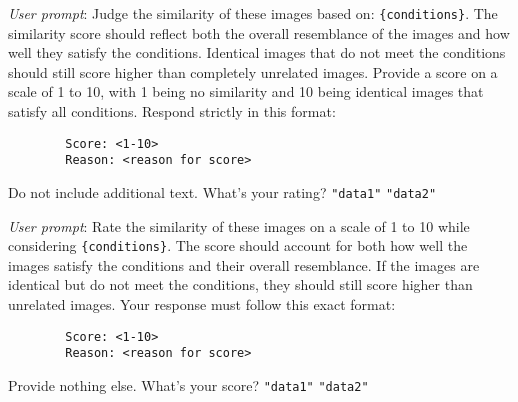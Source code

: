 \begin{tcolorbox}[enhanced,attach boxed title to top center={yshift=-3mm,yshifttext=-1mm},
  colback=blue!5!white,colframe=blue!20!gray,colbacktitle=blue!20!gray,
  title=Image-Image Prompt Template V4,fonttitle=\bfseries,
  boxed title style={size=small,colframe=blue!20!gray} ]

        \emph{User prompt}: Judge the similarity of these images based on: \texttt{\{conditions\}}. The similarity score should reflect both the overall resemblance of the images and how well they satisfy the conditions. Identical images that do not meet the conditions should still score higher than completely unrelated images. Provide a score on a scale of 1 to 10, with 1 being no similarity and 10 being identical images that satisfy all conditions. Respond strictly in this format:
        
        \begin{verbatim}
        Score: <1-10>
        Reason: <reason for score>
        \end{verbatim}
                
        Do not include additional text. What's your rating? \texttt{"data1"} \texttt{"data2"}

\end{tcolorbox}

\begin{tcolorbox}[enhanced,attach boxed title to top center={yshift=-3mm,yshifttext=-1mm},
  colback=blue!5!white,colframe=blue!20!gray,colbacktitle=blue!20!gray,
  title=Image-Image Prompt Template V5,fonttitle=\bfseries,
  boxed title style={size=small,colframe=blue!20!gray} ]

        \emph{User prompt}: Rate the similarity of these images on a scale of 1 to 10 while considering \texttt{\{conditions\}}. The score should account for both how well the images satisfy the conditions and their overall resemblance. If the images are identical but do not meet the conditions, they should still score higher than unrelated images. Your response must follow this exact format:
        
        \begin{verbatim}
        Score: <1-10>
        Reason: <reason for score>
        \end{verbatim}
                
        Provide nothing else. What's your score? \texttt{"data1"} \texttt{"data2"}

\end{tcolorbox}


